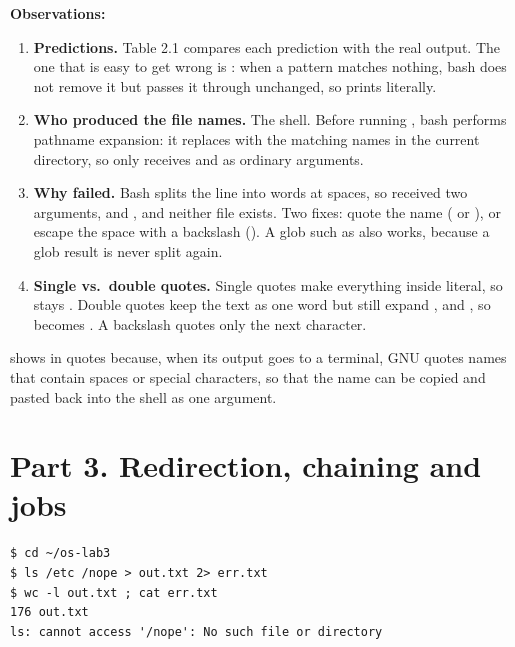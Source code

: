 \documentclass[11pt,a4paper]{article}
\begin{document}
\textbf{Observations:}
\begin{enumerate}
  \item \textbf{Predictions.} Table 2.1 compares each prediction with the real output. The one
  that is easy to get wrong is : when a pattern matches nothing, bash does not
  remove it but passes it through unchanged, so  prints  literally.
  \item \textbf{Who produced the file names.} The shell. Before running , bash
  performs pathname expansion: it replaces  with the matching names in the current
  directory, so  only receives  and  as ordinary arguments.
  \item \textbf{Why  failed.} Bash splits the line into words at spaces,
  so  received two arguments,  and , and neither file
  exists. Two fixes: quote the name ( or ), or
  escape the space with a backslash (). A glob such as
   also works, because a glob result is never split again.
  \item \textbf{Single vs.\ double quotes.} Single quotes make everything inside literal, so
   stays . Double quotes keep the text as one word but still expand
  ,  and , so  becomes
  . A backslash quotes only the next character.
\end{enumerate}

 shows  in quotes because, when its output goes to a terminal,
GNU  quotes names that contain spaces or special characters, so that the name can be
copied and pasted back into the shell as one argument.

\section{Part 3. Redirection, chaining and jobs}

\begin{lstlisting}[caption={stdout and stderr in separate files}]
$ cd ~/os-lab3
$ ls /etc /nope > out.txt 2> err.txt
$ wc -l out.txt ; cat err.txt
176 out.txt
ls: cannot access '/nope': No such file or directory
\end{lstlisting}
\end{document}
